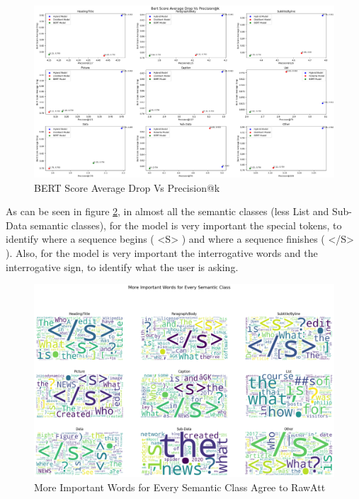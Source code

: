 \begin{figure}[H]
    \centering%
    \includegraphics[width=\linewidth]{Figures/Experimental Setup/bert_precision.png}
    \caption{BERT Score Average Drop Vs Precision@k}
    \label{fig:bert_precision}
\end{figure}


As can be seen in figure \ref{fig:important_words},  in almost all the semantic classes (less List and Sub-Data semantic classes), for the model is very important the special tokens, to identify where a sequence begins ( <S> ) and where a sequence finishes ( </S> ). Also, for the model is very important the interrogative words and the interrogative sign, to identify what the user is asking. 


\begin{figure}[H]
    \centering%
    \includegraphics[width=\linewidth]{Figures/Experimental Setup/relevance_words.png}
    \caption{More Important Words for Every Semantic Class Agree to RawAtt}
    \label{fig:important_words}
\end{figure}

